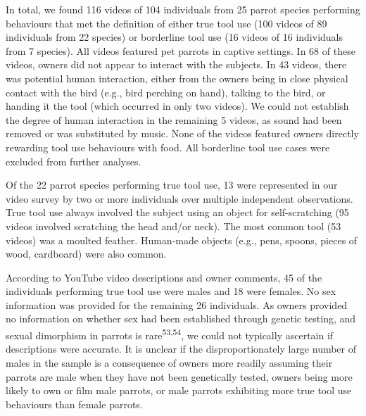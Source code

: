 \documentclass[
  man, donotrepeattitle,floatsintext]{apa6}
\begin{document}
In total, we found 116 videos of
104 individuals from
25
parrot species performing behaviours that met the definition of either true tool
use (100 videos of
89
individuals from
22
species) or borderline tool use (16 videos of
16
individuals from
7
species). All videos featured pet parrots in captive settings. In
68 of these
videos, owners did not appear to interact with the subjects. In
43 videos,
there was potential human interaction, either from the owners being in close physical
contact with the bird (e.g., bird perching on hand), talking to the bird, or
handing it the tool (which occurred in only two videos). We could not establish
the degree of human interaction in the remaining
5
videos, as sound had been removed or was substituted by music. None of the
videos featured owners directly rewarding tool use behaviours with food. All
borderline tool use cases were excluded from further analyses.

Of the 22
parrot species performing true tool use,
13
were represented in our video survey by two or more individuals over multiple
independent observations. True tool use always involved the subject using an
object for self-scratching (95
videos involved scratching the head and/or neck). The most common tool (53
videos) was a moulted feather. Human-made objects (e.g., pens, spoons, pieces of
wood, cardboard) were also common.

According to YouTube video descriptions and owner comments,
45
of the individuals performing true tool use were males and
18
were females. No sex information was provided for the remaining
26
individuals. As owners provided no information on whether sex had been
established through genetic testing, and sexual dimorphism in parrots is
rare\textsuperscript{53,54}, we could not typically ascertain if descriptions
were accurate. It is unclear if the disproportionately large number of males in
the sample is a consequence of owners more readily assuming their parrots are
male when they have not been genetically tested, owners being more likely to own
or film male parrots, or male parrots exhibiting more true tool use behaviours
than female parrots.
\end{document}

